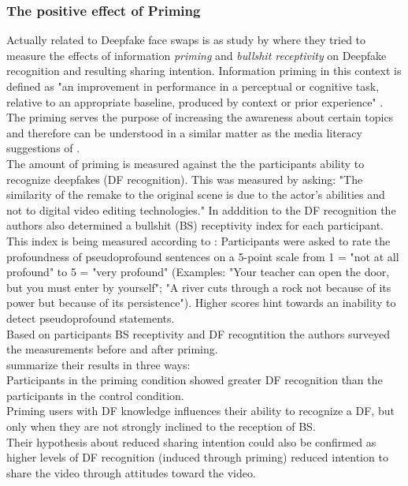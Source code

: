 \documentclass[
  a4paper,  %
  twoside,  %
  bibliography=totoc,
  headsepline,
  cleardoublepage=empty,
  parskip=half,
  draft=false
]{scrbook}
\begin{document}
\subsubsection*{The positive effect of Priming}
Actually related to Deepfake face swaps is as study by \citeauthor{iacobucciDeepfakesUnmaskedEffects2021} where they tried to measure the effects of information \textit{priming} and \textit{bullshit receptivity} on Deepfake recognition and resulting sharing intention. Information priming in this context is defined as "an improvement in performance in a perceptual or cognitive task, relative to an appropriate baseline, produced by context or prior experience" \cite{iacobucciDeepfakesUnmaskedEffects2021}. The priming serves the purpose of increasing the awareness about certain topics and therefore can be understood in a similar matter as the media literacy suggestions of \citeauthor{hwangEffectsDisinformationUsing2021}. \\
The amount of priming is measured against the the participants ability to recognize deepfakes (DF recognition). This was measured by asking: "The similarity of the remake to the original scene is due to the actor's abilities and not to digital video editing technologies." In adddition to the DF recognition the authors also determined a bullshit (BS) receptivity index for each participant. This index is being measured according to \cite{pennycookReceptionDetectionPseudoprofound2015}: Participants were asked to rate the profoundness of pseudoprofound sentences on a 5-point scale from 1 = "not at all profound" to 5 = "very profound" (Examples: "Your teacher can open the door, but you must enter by yourself"; "A river cuts through a rock not because of its power but because of its persistence"). Higher scores hint towards an inability to detect pseudoprofound statements. \\
Based on participants BS receptivity and DF recogntition the authors surveyed the measurements before and after priming. \\
\citeauthor{iacobucciDeepfakesUnmaskedEffects2021} summarize their results in three ways: \\
Participants in the priming condition showed greater DF recognition than the participants in the control condition. \\
Priming users with DF knowledge influences their ability to recognize a DF, but only when they are not strongly inclined to the reception of BS. \\
Their hypothesis about reduced sharing intention could also be confirmed as higher levels of DF recognition (induced through priming) reduced intention to share the video through attitudes toward the video. \\
\end{document}
